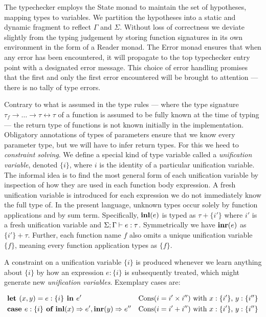 The typechecker employs the State monad to maintain the set of hypotheses,
mapping types to variables. We partition the hypotheses into a static and
dynamic fragment to reflect $\Gamma$ and $\Sigma$. Without loss of correctness
we deviate slightly from the typing judgement by storing function signatures in
its own environment in the form of a Reader monad. The Error monad ensures that
when any error has been encountered, it will propagate to the top typechecker
entry point with a designated error message. This choice of error handling
promises that the first and only the first error encountered will be brought to
attention --- there is no tally of type errors.

Contrary to what is assumed in the type rules --- where the type signature
$\tau_f \rightarrow \dots \rightarrow \tau \leftrightarrow \tau$ of a function
is assumed to be fully known at the time of typing --- the return type of
functions is not known initially in the implementation. Obligatory annotations
of types of parameters ensure that we know every parameter type, but we will
have to infer return types. For this we heed to \emph{constraint solving}. We
define a special kind of type variable called a \emph{unification variable},
denoted $\{i\}$, where $i$ is the identity of a particular unification
variable. The informal idea is to find the most general form of each
unification variable by inspection of how they are used in each function body
expression. A fresh unification variable is introduced for each expression we
do not immediately know the full type of. In the present language, unknown
types occur solely by function applications and by sum term. Specifically,
$\textbf{inl}(e)$ is typed as $\tau + \{i'\}$ where $i'$ is a fresh unification
variable and $\Sigma;\Gamma\vdash e : \tau$.  Symmetrically we have $\textbf{inr}(e)$ as $\{i'\} +
\tau$. Further, each function name $f$ also omits a unique unification variable
$\{f\}$, meaning every function application types as $\{f\}$.

A constraint on a unification variable $\{i\}$ is produced whenever we learn
anything about $\{i\}$ by how an expression $e : \{i\}$ is subsequently
treated, which might generate new \emph{unification variables}. Exemplary cases
are:

\begin{align*}
  &\textbf{let } (x, y) = e : \{i\} \textbf{ in } e' & \text{Cons}(i = i' \times i'') \text{ with $x : \{i'\}$, $y : \{i''\}$} \\
  &\textbf{case } e : \{i\} \textbf{ of } \textbf{inl}(x) \Rightarrow e', \textbf{inr}(y) \Rightarrow e'' & \text{Cons}(i = i' + i'') \text{ with $x : \{i'\}$, $y : \{i''\}$} \\
\end{align*}


